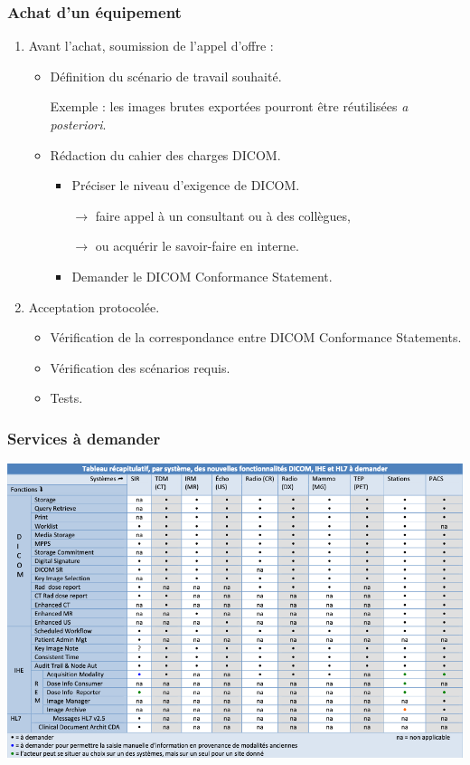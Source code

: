 \frame
{
	\frametitle{Achat d'un \'equipement}
	\begin{enumerate}
		\item Avant l'achat, soumission de l'appel d'offre :
		\begin{itemize}
			\item<2-> D\'efinition du sc\'enario de travail souhait\'e.

			Exemple : les images brutes export\'ees pourront \^etre r\'eutilis\'ees \emph{a posteriori}.
			\item<3-> R\'edaction du cahier des charges DICOM.
			\begin{itemize}
				\item<3-> Pr\'eciser le niveau d'exigence de DICOM.
				
				$\rightarrow$ faire appel \`a un consultant ou \`a des coll\`egues,
				
				$\rightarrow$ ou acqu\'erir le savoir-faire en interne.
				\item<4-> Demander le DICOM Conformance Statement.
			\end{itemize}
		\end{itemize}
		\item<5-> Acceptation protocol\'ee.
		\begin{itemize}
			\item<6-> V\'erification de la correspondance entre DICOM Conformance Statements.
			\item<7-> V\'erification des sc\'enarios requis.
			\item<8-> Tests.
		\end{itemize}
	\end{enumerate}
}

\frame
{
	\frametitle{Services \`a demander}
	\begin{center}
		\includegraphics[width=\linewidth]{./figures/tableau-services.png}
	\end{center}
}

